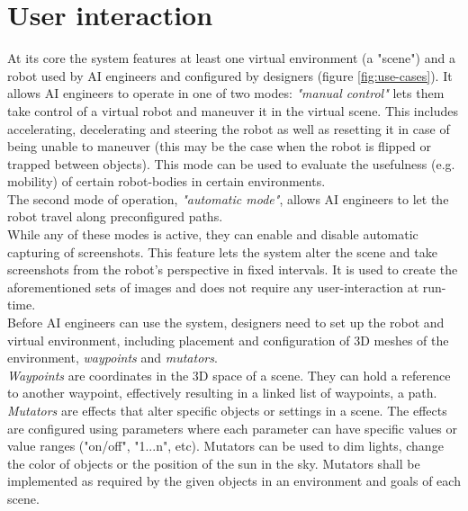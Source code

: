 \section{User interaction}
At its core the system features at least one virtual environment (a "scene") and a robot used by AI engineers and configured by designers (figure \ref{fig:use-cases}). It allows AI engineers to operate in one of two modes: \textit{"manual control"} lets them take control of a virtual robot and maneuver it in the virtual scene. This includes accelerating, decelerating and steering the robot as well as resetting it in case of being unable to maneuver (this may be the case when the robot is flipped or trapped between objects). This mode can be used to evaluate the usefulness (e.g. mobility) of certain robot-bodies in certain environments.\\
The second mode of operation, \textit{"automatic mode"}, allows AI engineers to let the robot travel along preconfigured paths.\\
While any of these modes is active, they can enable and disable automatic capturing of screenshots. This feature lets the system alter the scene and take screenshots from the robot's perspective in fixed intervals. It is used to create the aforementioned sets of images and does not require any user-interaction at run-time.\\
Before AI engineers can use the system, designers need to set up the robot and virtual environment, including placement and configuration of 3D meshes of the environment, \textit{waypoints} and \textit{mutators}.\\
\textit{Waypoints} are coordinates in the 3D space of a scene. They can hold a reference to another waypoint, effectively resulting in a linked list of waypoints, a path.\\
\textit{Mutators} are effects that alter specific objects or settings in a scene. The effects are configured using parameters where each parameter can have specific values or value ranges ("on/off", "1...n", etc). Mutators can be used to dim lights, change the color of objects or the position of the sun in the sky. Mutators shall be implemented as required by the given objects in an environment and goals of each scene.


